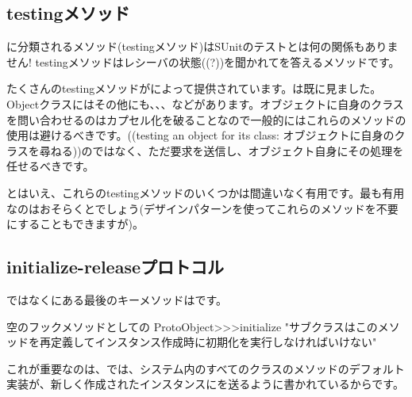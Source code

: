 \documentclass[a4paper,10pt,twoside]{book}
\begin{document}
\subsection{testingメソッド}

 に分類されるメソッド(testingメソッド)はSUnitのテストとは何の関係もありません! testingメソッドはレシーバの状態((?))を聞かれてを答えるメソッドです。

たくさんのtestingメソッドがによって提供されています。は既に見ました。Objectクラスにはその他にも、、、などがあります。オブジェクトに自身のクラスを問い合わせるのはカプセル化を破ることなので一般的にはこれらのメソッドの使用は避けるべきです。((testing an object for its class: オブジェクトに自身のクラスを尋ねる))のではなく、ただ要求を送信し、オブジェクト自身にその処理を任せるべきです。

とはいえ、これらのtestingメソッドのいくつかは間違いなく有用です。最も有用なのはおそらくとでしょう(\cite{Wool98a}デザインパターンを使ってこれらのメソッドを不要にすることもできますが)。


\subsection{initialize-releaseプロトコル}

ではなくにある最後のキーメソッドはです。

\begin{method}{空のフックメソッドとしての}
ProtoObject>>>initialize
   "サブクラスはこのメソッドを再定義してインスタンス作成時に初期化を実行しなければいけない"
\end{method}

これが重要なのは、\pharo では、システム内のすべてのクラスのメソッドのデフォルト実装が、新しく作成されたインスタンスにを送るように書かれているからです。
\end{document}
